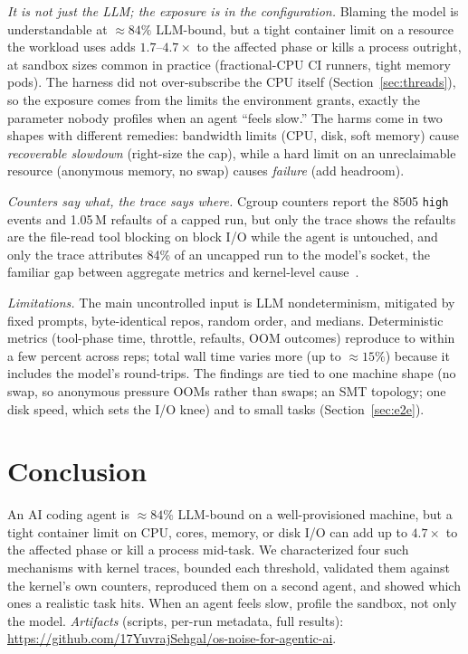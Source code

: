 \documentclass[10pt,conference]{IEEEtran}
\begin{document}
\emph{It is not just the LLM; the exposure is in the configuration.}
Blaming the model is understandable at ${\approx}84\%$ LLM-bound, but a
tight container limit on a resource the workload uses adds
$1.7$--$4.7\times$ to the affected phase or kills a process outright, at
sandbox sizes common in practice (fractional-CPU CI runners, tight memory
pods). The harness did not over-subscribe the CPU itself (Section~\ref{sec:threads}), so the exposure comes from the limits
the environment grants, exactly the parameter nobody profiles when an agent
``feels slow.'' The harms come in two shapes with different remedies:
bandwidth limits (CPU, disk, soft memory) cause \emph{recoverable slowdown}
(right-size the cap), while a hard limit on an unreclaimable resource
(anonymous memory, no swap) causes \emph{failure} (add headroom).

\emph{Counters say what, the trace says where.} Cgroup counters report the
8505 \texttt{high} events and 1.05\,M refaults of a capped run, but only the
trace shows the refaults are the file-read tool blocking on block I/O while
the agent is untouched, and only the trace attributes 84\% of an uncapped
run to the model's socket, the familiar gap between aggregate metrics and
kernel-level cause~\cite{ezzati2018}.

\emph{Limitations.} The main uncontrolled input is LLM nondeterminism,
mitigated by fixed prompts, byte-identical repos, random order, and medians. Deterministic metrics (tool-phase time, throttle, refaults, OOM
outcomes) reproduce to within a few percent across reps; total wall time
varies more (up to ${\approx}15\%$) because it includes the model's
round-trips. The findings are tied to one machine shape (no swap, so anonymous
pressure OOMs rather than swaps; an SMT topology; one disk speed, which
sets the I/O knee) and to small tasks (Section~\ref{sec:e2e}).

\section{Conclusion}

An AI coding agent is ${\approx}84\%$ LLM-bound on a well-provisioned
machine, but a tight container limit on CPU, cores, memory, or disk I/O can
add up to $4.7\times$ to the affected phase or kill a process mid-task. We characterized four such mechanisms with kernel traces, bounded each
threshold, validated them against the kernel's own counters, reproduced
them on a second agent, and showed which ones a realistic task hits. When
an agent feels slow, profile the sandbox, not only the model.
\emph{Artifacts} (scripts, per-run metadata, full results):
\url{https://github.com/17YuvrajSehgal/os-noise-for-agentic-ai}.
\end{document}
